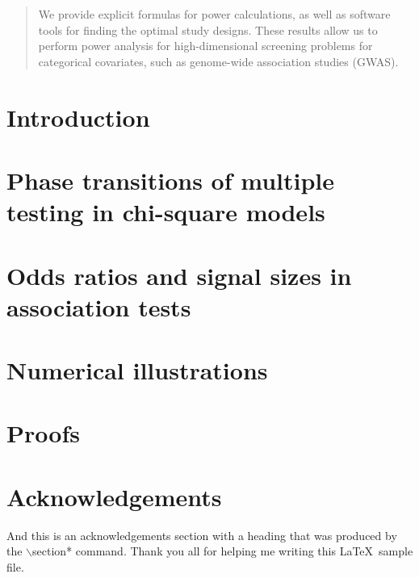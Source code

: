 \documentclass[ejs]{imsart}
\numberwithin{equation}{section}
\theoremstyle{plain}
\theoremstyle{definition}
\theoremstyle{remark}
\begin{document}
\begin{frontmatter}
\begin{abstract}
We provide explicit formulas for power calculations, as well as software tools for finding the optimal study designs.
These results allow us to perform power analysis for high-dimensional screening problems for categorical covariates, such as genome-wide association studies (GWAS).
\end{abstract}

\begin{keyword}[class=MSC]
\end{keyword}

\begin{keyword}
\end{keyword}
\tableofcontents
\end{frontmatter}

\section{Introduction}
\label{sec:intro}


\section{Phase transitions of multiple testing in chi-square models}
\label{sec:chisq-boundaries}


\section{Odds ratios and signal sizes in association tests}
\label{sec:signal-size-odds-ratio}


\section{Numerical illustrations}
\label{sec:numerical}


\appendix
\section{Proofs}
\label{sec:proofs}



\section*{Acknowledgements}
And this is an acknowledgements section with a heading that was produced by the
$\backslash$section* command. Thank you all for helping me writing this
\LaTeX\ sample file.
\end{document}
